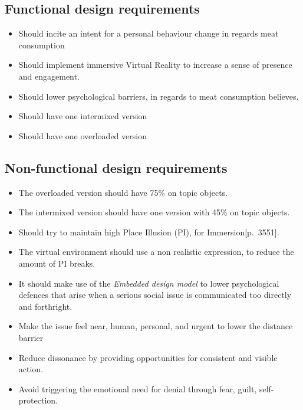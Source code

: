 \subsection{Functional design requirements}
\begin{itemize}
    \item Should incite an intent for a personal behaviour change in regards meat consumption
    \item Should implement immersive Virtual Reality to increase a sense of presence and engagement.
    \item Should lower psychological barriers, in regards to meat consumption believes.\cite{the5Ds}
    \item Should have one intermixed version
    \item Should have one overloaded version
\end{itemize}


\subsection{Non-functional design requirements}
\begin{itemize}
    \item The overloaded version should have 75\% on topic objects.
    \item The intermixed version should have one version with 45\% on topic objects.
    
    \item Should try to maintain high Place Illusion (PI), for Immersion\citep{vrImmersion}[p.~3551].
    \item The virtual environment should use a non realistic expression, to reduce the amount of PI breaks.
    
    \item It should make use of the \textit{Embedded design model} to lower psychological defences that arise when a serious social issue is communicated too directly and forthright\cite{embeddedDesignModel}.
    
    \item Make the issue feel near, human, personal, and urgent to lower the distance barrier %
    \item Reduce dissonance by providing opportunities for consistent and visible action. %
    \item Avoid triggering the emotional need for denial through fear, guilt, self-protection\cite{the5Ds}. %
    
\end{itemize}